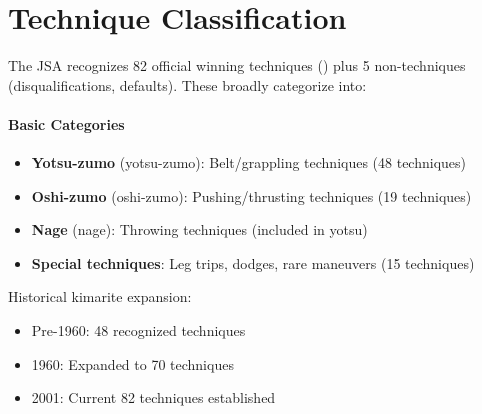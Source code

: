 \section{Technique Classification}

The JSA recognizes 82 official winning techniques () plus 5 non-techniques (disqualifications, defaults). These broadly categorize into:

\paragraph{Basic Categories}
\begin{itemize}
\item \textbf{Yotsu-zumo} (yotsu-zumo): Belt/grappling techniques (48 techniques)
\item \textbf{Oshi-zumo} (oshi-zumo): Pushing/thrusting techniques (19 techniques)
\item \textbf{Nage} (nage): Throwing techniques (included in yotsu)
\item \textbf{Special techniques}: Leg trips, dodges, rare maneuvers (15 techniques)
\end{itemize}

Historical kimarite expansion:
\begin{itemize}
\item Pre-1960: 48 recognized techniques
\item 1960: Expanded to 70 techniques
\item 2001: Current 82 techniques established
\end{itemize}